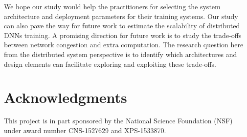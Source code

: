 \documentclass[conference]{IEEEtran}
\begin{document}
We hope our study would help the practitioners for selecting the system architecture and deployment parameters for their training systems. 
Our study can also pave the way for future work to estimate the scalability of distributed DNNs training. A promising direction for future work is to study the trade-offs between network congestion and extra computation. The research question here from the distributed system perspective is to identify which architectures and design elements can facilitate exploring and exploiting these trade-offs.

\section{Acknowledgments}
\label{sec:Acknow}

This project is in part sponsored by the National Science Foundation (NSF) under award number CNS-1527629 and XPS-1533870. 





%
\end{document}
